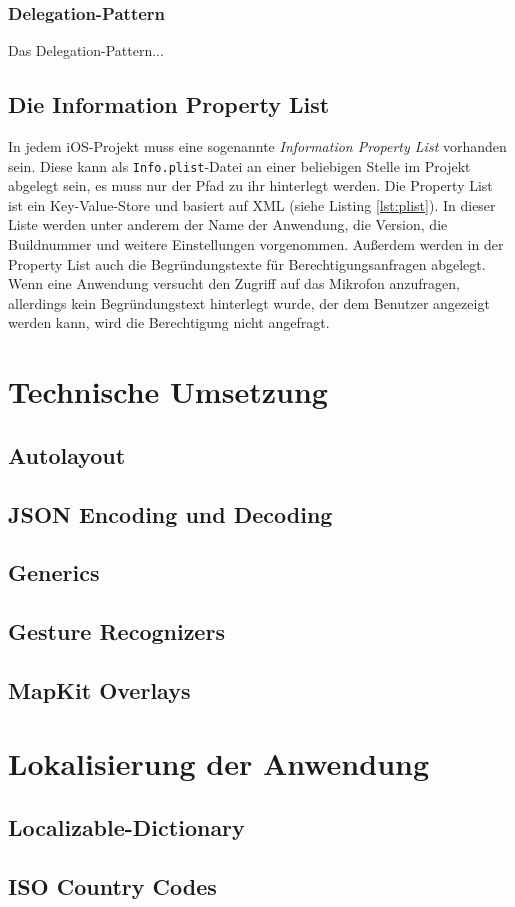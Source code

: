 \subsubsection{Delegation-Pattern}
Das Delegation-Pattern...

\subsection{Die Information Property List}
In jedem iOS-Projekt muss eine sogenannte \textit{Information Property List} vorhanden sein.
Diese kann als \texttt{Info.plist}-Datei an einer beliebigen Stelle im Projekt abgelegt sein, es muss nur der Pfad zu ihr hinterlegt werden.
Die Property List ist ein Key-Value-Store und basiert auf XML (siehe Listing \ref{lst:plist}).
In dieser Liste werden unter anderem der Name der Anwendung, die Version, die Buildnummer und weitere Einstellungen vorgenommen.
Außerdem werden in der Property List auch die Begründungstexte für Berechtigungsanfragen abgelegt.
Wenn eine Anwendung versucht den Zugriff auf das Mikrofon anzufragen, allerdings kein Begründungstext hinterlegt wurde, der dem Benutzer angezeigt werden kann, wird die Berechtigung nicht angefragt.
\\

\section{Technische Umsetzung}
\subsection{Autolayout}
\subsection{JSON Encoding und Decoding}
\subsection{Generics}
\subsection{Gesture Recognizers}
\subsection{MapKit Overlays}

\section{Lokalisierung der Anwendung}
\subsection{Localizable-Dictionary}
\subsection{ISO Country Codes}
